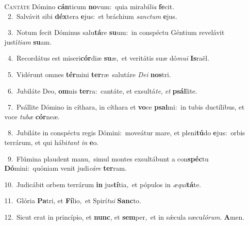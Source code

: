 \lettrine{\initial\textcolor{\initialcolor}{C}}{antáte} Dómino \textbf{cán}\-ticum \textbf{no}\-vum:~\star quia mirabí\-\textit{li}\-\textit{a} \textbf{fe}\-cit.\\
{\numbfont\textcolor{\numbcolor}{~2.}}~Salvávit sibi \textbf{déx}\-tera \textbf{e}\-jus:~\star et bráchium \textit{sanc}\-\textit{tum} \textbf{e}\-jus.\par
{\numbfont\textcolor{\numbcolor}{~3.}}~Notum fecit Dóminus salu\-\textbf{tá}\-re \textbf{su}\-um:~\star in conspéctu Géntium revelávit justí\-\textit{ti}\-\textit{am} \textbf{su}\-am.\par
{\numbfont\textcolor{\numbcolor}{~4.}}~Recordátus est miseri\-\textbf{cór}\-diæ \textbf{su}\-æ,~\star et veritátis suæ dó\-\textit{mu}\-\textit{i} \textbf{Is}\-raël.\par
{\numbfont\textcolor{\numbcolor}{~5.}}~Vidérunt omnes \textbf{tér}\-mini \textbf{ter}\-ræ~\star salutáre \textit{De}\-\textit{i} \textbf{nos}\-tri.\par
{\numbfont\textcolor{\numbcolor}{~6.}}~Jubiláte Deo, \textbf{om}\-nis \textbf{ter}\-ra:~\star cantáte, et exsultá\-\textit{te}\-, \textit{et} \textbf{psál}\-lite.\par
{\numbfont\textcolor{\numbcolor}{~7.}}~Psállite Dómino in cíthara, in cíthara et \textbf{vo}\-ce \textbf{psal}\-mi:~\star in tubis ductílibus, et voce \textit{tu}\-\textit{bæ} \textbf{cór}\-neæ.\par
{\numbfont\textcolor{\numbcolor}{~8.}}~Jubiláte in conspéctu regis Dómini:~\dagger moveátur mare, et pleni\-\textbf{tú}\-do \textbf{e}\-jus:~\star orbis terrárum, et qui hábi\textit{tant} \textit{in} \textbf{e}\-o.\par
{\numbfont\textcolor{\numbcolor}{~9.}}~Flúmina plaudent manu,~\dagger simul montes exsultábunt a con\-\textbf{spéc}\-tu \textbf{Dó}\-mini:~\star quóniam venit judi\-\textit{cá}\-\textit{re} \textbf{ter}\-ram.\par
{\numbfont\textcolor{\numbcolor}{10.}}~Judicábit orbem terrárum \textbf{in} jus\-\textbf{tí}\-tia,~\star et pópulos in \textit{æ}\-\textit{qui}\textbf{tá}te.\par
{\numbfont\textcolor{\numbcolor}{11.}}~Glória \textbf{Pa}\-tri, et \textbf{Fí}\-lio,~\star et Spirí\-\textit{tu}\-\textit{i} \textbf{Sanc}\-to.\par
{\numbfont\textcolor{\numbcolor}{12.}}~Sicut erat in princípio, et \textbf{nunc}\-, et \textbf{sem}\-per,~\star et in sǽcula sæcu\-\textit{ló}\-\textit{rum}. \textbf{A}\-men.\par
